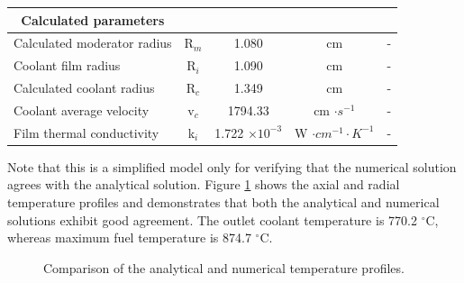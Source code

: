 \begin{table}[htbp!]
\begin{tabular}{@{}l c c c c}
    \midrule
  \multicolumn{1}{c}{Calculated parameters} &  &  &  & \\  
    \midrule
  Calculated moderator radius  & R$_m$ & 1.080  	& cm    & - \\
  Coolant film radius   		   & R$_i$ & 1.090  	& cm    & - \\
  Calculated coolant radius 	 & R$_c$ & 1.349  	& cm    & - \\
  Coolant average velocity  	 & v$_c$ & 1794.33 	& cm $\cdot s^{-1}$ & - \\
  Film thermal conductivity  	 & k$_i$ & 1.722 $\times 10^{-3}$ & W $\cdot cm^{-1} \cdot K^{-1}$ & - \\
  \bottomrule
  \end{tabular}
\end{table}

Note that this is a simplified model only for verifying that the numerical solution agrees with the analytical solution.
Figure \ref{fig:th-ver-results} shows the axial and radial temperature profiles and demonstrates that both the analytical and numerical solutions exhibit good agreement.
The outlet coolant temperature is 770.2 $^{\circ}$C, whereas maximum fuel temperature is 874.7 $^{\circ}$C.

\begin{figure}[htbp!]
	\centering
	\hfill
    \caption{Comparison of the analytical and numerical temperature profiles.}
	\label{fig:th-ver-results}
\end{figure}

